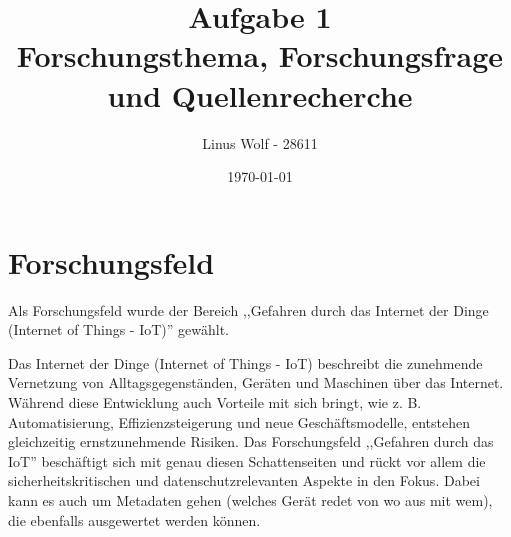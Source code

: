\documentclass[12pt, a4paper, onecolumn, oneside, toc=bibliographynumbered, liststotoc]{scrartcl} %
\begin{document}
	\titlehead{Hochschule Rhein-Waal \\ %
	Fakultät: Kommunikation und Umwelt\\
	Studiengang: Verwaltungsinformatik\\
	Modul: Workshop 2: Wissenschaftliches Schreiben\\}
	\title{Aufgabe 1\\
	Forschungsthema, Forschungsfrage und Quellenrecherche} %
	\author{Linus Wolf - 28611}
	\date{\today} %

\maketitle %


\newpage %

	\section{Forschungsfeld}
Als Forschungsfeld wurde der Bereich ,,Gefahren durch das Internet der Dinge (Internet of Things - IoT)'' gewählt.

Das Internet der Dinge (Internet of Things - IoT) beschreibt die zunehmende Vernetzung von Alltagsgegenständen, Geräten und Maschinen über das Internet. Während diese Entwicklung auch Vorteile mit sich bringt, wie z. B. Automatisierung, Effizienzsteigerung und neue Geschäftsmodelle, entstehen gleichzeitig ernstzunehmende Risiken. Das Forschungsfeld ,,Gefahren durch das IoT'' beschäftigt sich mit genau diesen Schattenseiten und rückt vor allem die sicherheitskritischen und datenschutzrelevanten Aspekte in den Fokus. Dabei kann es auch um Metadaten gehen (welches Gerät redet von wo aus mit wem), die ebenfalls ausgewertet werden können.
\end{document}
